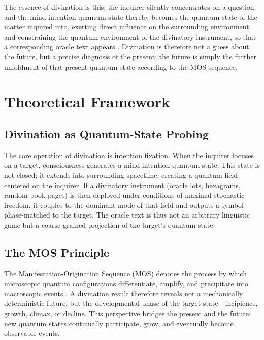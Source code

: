 \documentclass[11pt,a4paper]{article}
\begin{document}
The essence of divination is this: the inquirer silently concentrates on a question, and the mind-intention quantum state thereby becomes the quantum state of the matter inquired into, exerting direct influence on the surrounding environment and constraining the quantum environment of the divinatory instrument, so that a corresponding oracle text appears \cite{Li2026}. Divination is therefore not a guess about the future, but a precise diagnosis of the present; the future is simply the further unfoldment of that present quantum state according to the MOS sequence.


\section{Theoretical Framework}

\subsection{Divination as Quantum-State Probing}

The core operation of divination is intention fixation. When the inquirer focuses on a target, consciousness generates a mind-intention quantum state. This state is not closed; it extends into surrounding spacetime, creating a quantum field centered on the inquirer. If a divinatory instrument (oracle lots, hexagrams, random book pages) is then deployed under conditions of maximal stochastic freedom, it couples to the dominant mode of that field and outputs a symbol phase-matched to the target. The oracle text is thus not an arbitrary linguistic game but a coarse-grained projection of the target's quantum state.

\subsection{The MOS Principle}

The Manifestation-Origination Sequence (MOS) denotes the process by which microscopic quantum configurations differentiate, amplify, and precipitate into macroscopic events \cite{Li2026}. A divination result therefore reveals not a mechanically deterministic future, but the developmental phase of the target state---incipience, growth, climax, or decline. This perspective bridges the present and the future: new quantum states continually participate, grow, and eventually become observable events.
\end{document}
